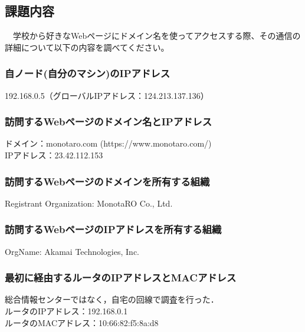 

\pagestyle{fancy}

\subsection{課題内容}
　学校から好きなWebページにドメイン名を使ってアクセスする際、その通信の詳細について以下の内容を調べてください。\\

\subsubsection{自ノード(自分のマシン)のIPアドレス}
192.168.0.5（グローバルIPアドレス：124.213.137.136）

\subsubsection{訪問するWebページのドメイン名とIPアドレス}
ドメイン：monotaro.com (https://www.monotaro.com/)\\
IPアドレス：23.42.112.153

\subsubsection{訪問するWebページのドメインを所有する組織}
Registrant Organization: MonotaRO Co., Ltd.

\subsubsection{訪問するWebページのIPアドレスを所有する組織}
OrgName: Akamai Technologies, Inc.

\subsubsection{最初に経由するルータのIPアドレスとMACアドレス}
総合情報センターではなく，自宅の回線で調査を行った．\\
ルータのIPアドレス：192.168.0.1\\
ルータのMACアドレス：10:66:82:f5:8a:d8



